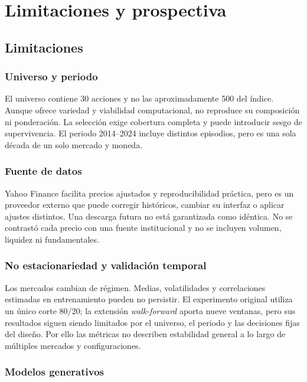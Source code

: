 \clearpage
\chapter{Limitaciones y prospectiva}

\section{Limitaciones}

\subsection{Universo y periodo}

El universo contiene 30 acciones y no las aproximadamente 500 del índice. Aunque ofrece variedad y viabilidad computacional, no reproduce su composición ni ponderación. La selección exige cobertura completa y puede introducir sesgo de supervivencia. El periodo 2014--2024 incluye distintos episodios, pero es una sola década de un solo mercado y moneda.

\subsection{Fuente de datos}

Yahoo Finance facilita precios ajustados y reproducibilidad práctica, pero es un proveedor externo que puede corregir históricos, cambiar su interfaz o aplicar ajustes distintos. Una descarga futura no está garantizada como idéntica. No se contrastó cada precio con una fuente institucional y no se incluyen volumen, liquidez ni fundamentales.

\subsection{No estacionariedad y validación temporal}

Los mercados cambian de régimen. Medias, volatilidades y correlaciones estimadas en entrenamiento pueden no persistir. El experimento original utiliza un único corte 80/20; la extensión \textit{walk-forward} aporta nueve ventanas, pero sus resultados siguen siendo limitados por el universo, el periodo y las decisiones fijas del diseño. Por ello las métricas no describen estabilidad general a lo largo de múltiples mercados y configuraciones.

\subsection{Modelos generativos}


